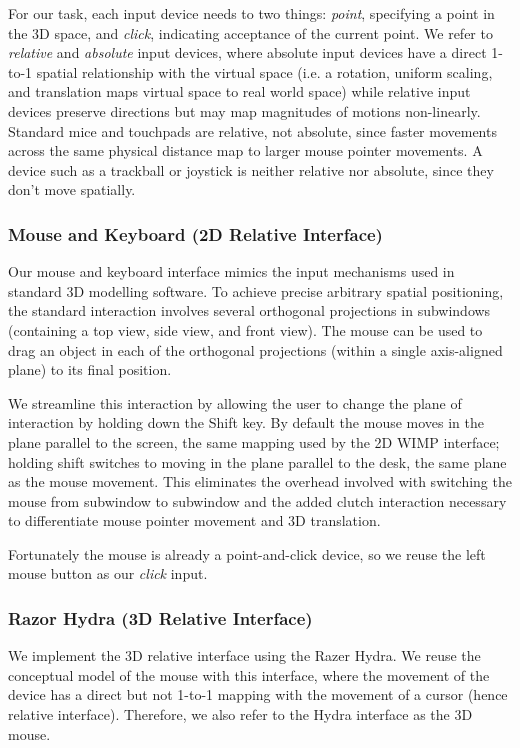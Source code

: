 For our task, each input device needs to two things: {\it point}, specifying a
point in the 3D space, and {\it click}, indicating acceptance of the current
point. We refer to {\it relative} and {\it absolute} input devices, where
absolute input devices have a direct 1-to-1 spatial relationship with the
virtual space (i.e. a rotation, uniform scaling, and translation maps virtual
space to real world space) while relative input devices preserve directions
but may map magnitudes of motions non-linearly. Standard mice and touchpads
are relative, not absolute, since faster movements across the same physical
distance map to larger mouse pointer movements. A device such as a trackball
or joystick is neither relative nor absolute, since they don't move spatially.

\subsubsection{Mouse and Keyboard (2D Relative Interface)}
Our mouse and keyboard interface mimics the input mechanisms used in standard
3D modelling software. To achieve precise arbitrary spatial positioning, the
standard interaction involves several orthogonal projections in subwindows
(containing a top view, side view, and front view). The mouse can be used to
drag an object in each of the orthogonal projections (within a single
axis-aligned plane) to its final position.

We streamline this interaction by allowing the user to change the plane of
interaction by holding down the Shift key. By default the mouse moves in the
plane parallel to the screen, the same mapping used by the 2D WIMP interface;
holding shift switches to moving in the plane parallel to the desk, the same
plane as the mouse movement. This eliminates the overhead involved with
switching the mouse from subwindow to subwindow and the added clutch
interaction \cite{bravenuiworld} necessary to differentiate mouse pointer
movement and 3D translation.

Fortunately the mouse is already a point-and-click device, so we reuse the
left mouse button as our {\it click} input.
\subsubsection{Razor Hydra (3D Relative Interface)}
We implement the 3D relative interface using the Razer Hydra. We reuse the
conceptual model of the mouse with this interface, where the movement of the
device has a direct but not 1-to-1 mapping with the movement of a cursor (hence
relative interface). Therefore, we also refer to the Hydra interface as the 3D
mouse.

